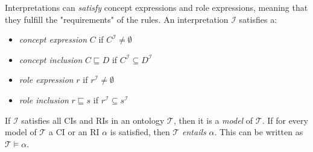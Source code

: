 Interpretations can \emph{satisfy} concept expressions and role expressions, meaning that they fulfill the "requirements" of the rules. An interpretation $\mathcal{I}$ satisfies a:
\begin{itemize}
    \item \emph{concept expression} $C$ if $C^{\mathcal{I}} \neq \emptyset$
    \item \emph{concept inclusion} $C \sqsubseteq D$ if $C^{\mathcal{I}} \subseteq D^{\mathcal{I}}$
    \item \emph{role expression} $r$ if $r^{\mathcal{I}} \neq \emptyset$
    \item \emph{role inclusion } $r \sqsubseteq s$ if $r^{\mathcal{I}}  \subseteq s^{\mathcal{I}}$
\end{itemize}

If $\mathcal{I}$ satisfies all CIs and RIs in an ontology $\mathcal{T}$, then it is a \emph{model} of $\mathcal{T}$. If for every model of $\mathcal{T}$ a CI or an RI $\alpha$ is satisfied, then $\mathcal{T}$ \emph{entails} $\alpha$. This can be written as $\mathcal{T} \models \alpha$.
